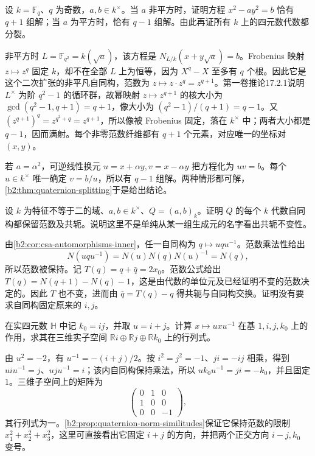 \begin{exercise}\label{b2:ex:17-finite-quaternion-norm-count}
	设 \(k=\mathbb F_q\)、\(q\) 为奇数，\(a,b\in k^\times\)。当 \(a\) 非平方时，证明方程 \(x^2-a y^2=b\) 恰有 \(q+1\) 组解；当 \(a\) 为平方时，恰有 \(q-1\) 组解。由此再证所有 \(k\) 上的四元数代数都分裂。
\end{exercise}
\begin{solution}
	非平方时 \(L=\mathbb F_{q^2}=k(\sqrt a)\)，该方程是 \(N_{L/k}(x+y\sqrt a)=b\)。Frobenius 映射 \(z\mapsto z^q\) 固定 \(k\)，却不在全部 \(L\) 上为恒等，因为 \(X^q-X\) 至多有 \(q\) 个根。因此它是这个二次扩张的非平凡自同构，范数为 \(z\mapsto z\cdot z^q=z^{q+1}\)。第一卷推论17.2.1说明 \(L^\times\) 为阶 \(q^2-1\) 的循环群，故幂映射 \(z\mapsto z^{q+1}\) 的核大小为 \(\gcd(q^2-1,q+1)=q+1\)，像大小为 \((q^2-1)/(q+1)=q-1\)。又 \((z^{q+1})^q=z^{q^2+q}=z^{q+1}\)，所以像被 Frobenius 固定，落在 \(k^\times\) 中；两者大小都是 \(q-1\)，因而满射。每个非零范数纤维都有 \(q+1\) 个元素，对应唯一的坐标对 \((x,y)\)。

	若 \(a=\alpha^2\)，可逆线性换元 \(u=x+\alpha y,v=x-\alpha y\) 把方程化为 \(uv=b\)。每个 \(u\in k^\times\) 唯一确定 \(v=b/u\)，所以有 \(q-1\) 组解。两种情形都可解，\cref{b2:thm:quaternion-splitting}于是给出结论。
\end{solution}

\begin{exercise}\label{b2:ex:17-quaternion-automorphisms-norm}
	设 \(k\) 为特征不等于二的域、\(a,b\in k^\times\)、\(Q=(a,b)_k\)。证明 \(Q\) 的每个 \(k\) 代数自同构都保留范数及共轭。说明这里不是单纯从某一组生成元的名字看出共轭不变性。
\end{exercise}
\begin{solution}
	由\cref{b2:cor:csa-automorphisms-inner}，任一自同构为 \(q\mapsto uqu^{-1}\)。范数乘法性给出
	\[
		N(uqu^{-1})=N(u)N(q)N(u)^{-1}=N(q),
	\]
	所以范数被保持。记 \(T(q)=q+\bar q=2x_0\)。范数公式给出 \(T(q)=N(q+1)-N(q)-1\)，这是由代数的单位元及已经证明不变的范数决定的。因此 \(T\) 也不变，进而由 \(\bar q=T(q)-q\) 得共轭与自同构交换。证明没有要求自同构固定原来的 \(i,j\)。
\end{solution}

\begin{exercise}\label{b2:ex:17-quaternion-conjugation-rotation}
	在实四元数 \(\mathbb H\) 中记 \(k_0=ij\)，并取 \(u=i+j\)。计算 \(x\mapsto uxu^{-1}\) 在基 \(1,i,j,k_0\) 上的作用，求其在三维实子空间 \(\mathbb Ri\oplus\mathbb Rj\oplus\mathbb Rk_0\) 上的行列式。
\end{exercise}
\begin{solution}
	由 \(u^2=-2\)，有 \(u^{-1}=-(i+j)/2\)。按 \(i^2=j^2=-1\)、\(ji=-ij\) 相乘，得到 \(uiu^{-1}=j\)、\(uju^{-1}=i\)；该内自同构保持乘法，所以 \(uk_0u^{-1}=ji=-k_0\)，并且固定 \(1\)。三维子空间上的矩阵为
	\[
		\begin{pmatrix}0&1&0\\1&0&0\\0&0&-1\end{pmatrix},
	\]
	其行列式为一。\cref{b2:prop:quaternion-norm-similitudes}保证它保持范数的限制 \(x_1^2+x_2^2+x_3^2\)，这里可直接看出它固定 \(i+j\) 的方向，并把两个正交方向 \(i-j,k_0\) 变号。
\end{solution}


